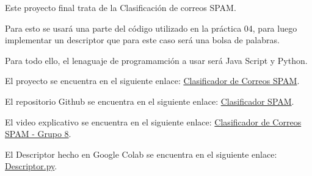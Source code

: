 \documentclass{article}
\begin{document}
	Este proyecto final trata de la Clasificación de correos SPAM.

    Para esto se usará una parte del código utilizado en la práctica 04, para luego implementar un descriptor que para este caso será una bolsa de palabras.

    Para todo ello, el lenaguaje de programamción a usar será Java Script y Python.
	
El proyecto se encuentra en el siguiente enlace: \href{https://jzegarra100.github.io/KNN-JavaScript/}{Clasificador de Correos SPAM}.

El repositorio Github se encuentra en el siguiente enlace: \href{https://github.com/JZegarra100/KNN-JavaScript}{Clasificador SPAM}.

El video explicativo se encuentra en el siguiente enlace: \href{https://drive.google.com/file/d/1NfUwgwIfmOVS-lJdUTfy-Xi-OsMFhuhn/view?usp=sharing}{Clasificador de Correos SPAM - Grupo 8}.

El Descriptor hecho en Google Colab se encuentra en el siguiente enlace: \href{https://drive.google.com/file/d/1aKbI9XpST5vEPgCVhG_p8aBYKxg3QREd/view?usp=sharing}{Descriptor.py}.
	
\end{document}
